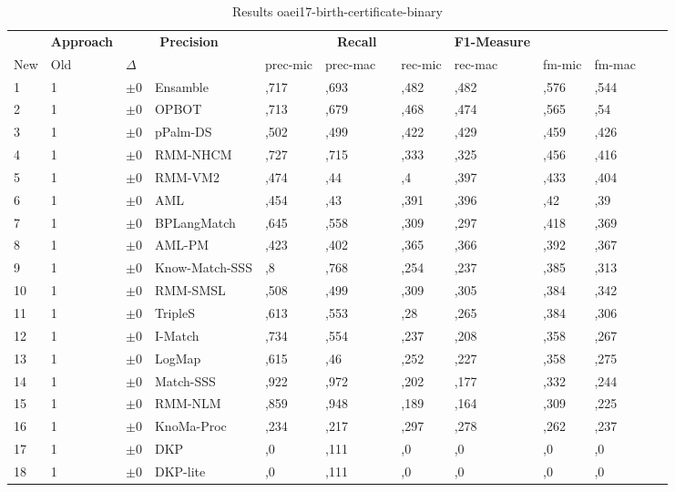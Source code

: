 \begin{table}[htb]
\setlength{\tabcolsep}{0.5em}
\centering
\scriptsize
\begin{tabular}[tb]{lllp{2.3cm}llllllllll}
\noalign{\smallskip}\hline\noalign{\smallskip}
\multicolumn{3}{c}{\textbf{Rank}}& \textbf{Approach}  & \multicolumn{2}{c}{\textbf{Precision}}  & \hspace*{1mm}  & \multicolumn{2}{c}{\textbf{Recall}}  & \hspace*{1mm}  & \multicolumn{2}{c}{\textbf{F1-Measure}}  & \hspace*{1mm} \\
New & Old & $\Delta$ & &prec-mic & prec-mac && rec-mic & rec-mac && fm-mic & fm-mac\\
\noalign{\smallskip}\hline\noalign{\smallskip}
1 & 1 		& $\pm$0 &Ensamble    	&	,717 & ,693 & & ,482 & ,482 & & ,576 & ,544\\
2 & 1 		& $\pm$0 &OPBOT    	&	,713 & ,679 & & ,468 & ,474 & & ,565 & ,54\\
3 & 1 		& $\pm$0 &pPalm-DS    	&	,502 & ,499 & & ,422 & ,429 & & ,459 & ,426\\
4 & 1 		& $\pm$0 &RMM-NHCM    	&	,727 & ,715 & & ,333 & ,325 & & ,456 & ,416\\
5 & 1 		& $\pm$0 &RMM-VM2    	&	,474 & ,44 & & ,4 & ,397 & & ,433 & ,404\\
6 & 1 		& $\pm$0 &AML    	&	,454 & ,43 & & ,391 & ,396 & & ,42 & ,39\\
7 & 1 		& $\pm$0 &BPLangMatch    	&	,645 & ,558 & & ,309 & ,297 & & ,418 & ,369\\
8 & 1 		& $\pm$0 &AML-PM    	&	,423 & ,402 & & ,365 & ,366 & & ,392 & ,367\\
9 & 1 		& $\pm$0 &Know-Match-SSS    	&	,8 & ,768 & & ,254 & ,237 & & ,385 & ,313\\
10 & 1 		& $\pm$0 &RMM-SMSL    	&	,508 & ,499 & & ,309 & ,305 & & ,384 & ,342\\
11 & 1 		& $\pm$0 &TripleS    	&	,613 & ,553 & & ,28 & ,265 & & ,384 & ,306\\
12 & 1 		& $\pm$0 &I-Match    	&	,734 & ,554 & & ,237 & ,208 & & ,358 & ,267\\
13 & 1 		& $\pm$0 &LogMap    	&	,615 & ,46 & & ,252 & ,227 & & ,358 & ,275\\
14 & 1 		& $\pm$0 &Match-SSS    	&	,922 & ,972 & & ,202 & ,177 & & ,332 & ,244\\
15 & 1 		& $\pm$0 &RMM-NLM    	&	,859 & ,948 & & ,189 & ,164 & & ,309 & ,225\\
16 & 1 		& $\pm$0 &KnoMa-Proc    	&	,234 & ,217 & & ,297 & ,278 & & ,262 & ,237\\
17 & 1 		& $\pm$0 &DKP    	&	,0 & ,111 & & ,0 & ,0 & & ,0 & ,0\\
18 & 1 		& $\pm$0 &DKP-lite    	&	,0 & ,111 & & ,0 & ,0 & & ,0 & ,0\\
\end{tabular}
\caption{Results oaei17-birth-certificate-binary}
\label{tbl:results}
\end{table}